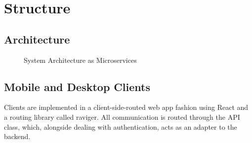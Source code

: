 \section{Structure}

\subsection{Architecture}
\begin{figure}[hb]
    \centering
    \caption{System Architecture as Microservices}
    \label{fig:microservices}
\end{figure}

\subsection{Mobile and Desktop Clients}
Clients are implemented in a client-side-routed web app fashion using React and a routing library called raviger. All communication is routed through the API class, which, alongside dealing with authentication, acts as an adapter to the backend.
